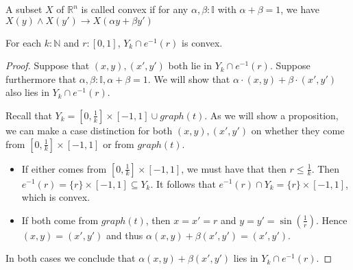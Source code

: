 \documentclass{../util/zariski}
\begin{document}
\begin{definition}
  A subset $X$ of $\mathbb R^n$ is called convex if 
  for any $\alpha,\beta:\mathbb I$ with $\alpha + \beta = 1$, we have 
  $X(y) \wedge X(y') \to X(\alpha y + \beta y')$
\end{definition}
\begin{lemma}
  For each $k:\mathbb N$ and $r:[0,1]$, $Y_k\cap e^{-1}(r)$ is convex. 
\end{lemma}
\begin{proof}
  Suppose that $(x,y), (x',y')$ both lie in $Y_k\cap e^{-1}(r)$. 
  Suppose furthermore that $\alpha,\beta:\mathbb I, \alpha+ \beta = 1$. 
  We will show that $\alpha\cdot (x,y) + \beta\cdot (x',y') $ also lies in 
  $Y_k \cap e^{-1}(r)$. 

  Recall that 
  $Y_k = [0,\frac1k] \times [-1,1]  \cup graph(t)$. 
  As we will show a proposition, we can make a case distinction 
  for both $(x,y), (x',y')$ on whether they come from $[0,\frac 1k] \times [-1,1]$ or 
  from $graph(t)$.
  \begin{itemize}
    \item 
      If either comes from $[0,\frac1k] \times [-1,1]$, we must have that 
      then $r \leq \frac1k$. 
      Then $e^{-1}(r) = \{r\} \times [-1,1]\subseteq Y_k$. 
      It follows that $e^{-1}(r) \cap Y_k = \{r\} \times [-1, 1]$, which is convex. 
    \item 
      If both come from $graph(t)$, 
      then $x = x' = r$ and $y = y' = \sin(\frac1r)$. 
      Hence $(x,y) = (x',y')$ and thus $\alpha(x,y) + \beta(x',y') = (x',y')$. 
  \end{itemize}
  In both cases we conclude that $\alpha (x,y) + \beta(x',y')$ lies in 
  $Y_k\cap e^{-1}(r)$. 
\end{proof}
\end{document}
